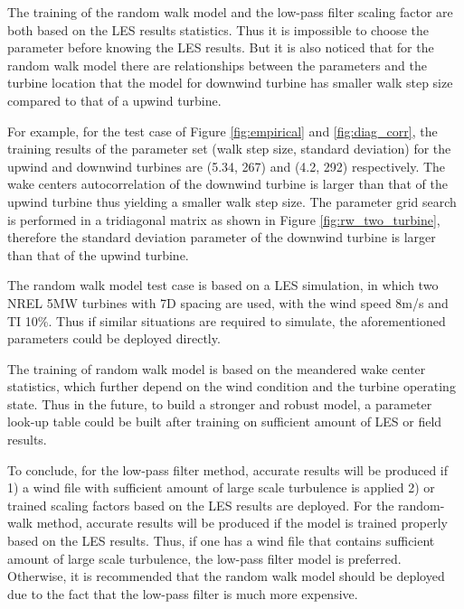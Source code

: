 \documentclass{umthesis}
\begin{document}
The training of the random walk model and the low-pass filter scaling factor are both based on the LES results statistics. Thus it is impossible to choose the parameter before knowing the LES results. But it is also noticed that for the random walk model there are relationships between the parameters and the turbine location that the model for downwind turbine has smaller walk step size compared to that of a upwind turbine.

For example, for the test case of Figure \ref{fig:empirical} and \ref{fig:diag_corr}, the training results of the parameter set (walk step size, standard deviation) for the upwind and downwind turbines are (5.34, 267) and (4.2, 292) respectively. The wake centers autocorrelation of the downwind turbine is larger than that of the upwind turbine thus yielding a smaller walk step size. The parameter grid search is performed in a tridiagonal matrix as shown in Figure \ref{fig:rw_two_turbine}, therefore the standard deviation parameter of the downwind turbine is larger than that of the upwind turbine.

The random walk model test case is based on a LES simulation, in which two NREL 5MW turbines with 7D spacing are used, with the wind speed 8m/s and TI 10\%. Thus if similar situations are required to simulate, the aforementioned parameters could be deployed directly.

The training of random walk model is based on the meandered wake center statistics, which further depend on the wind condition and the turbine operating state. Thus in the future, to build a stronger and robust model, a parameter look-up table could be built after training on sufficient amount of LES or field results.

To conclude, for the low-pass filter method, accurate results will be produced if 1) a wind file with sufficient amount of large scale turbulence is applied 2) or trained scaling factors based on the LES results are deployed. For the random-walk method, accurate results will be produced if the model is trained properly based on the LES results. Thus, if one has a wind file that contains sufficient amount of large scale turbulence, the low-pass filter model is preferred. Otherwise, it is recommended that the random walk model should be deployed due to the fact that the low-pass filter is much more expensive.
\end{document}
